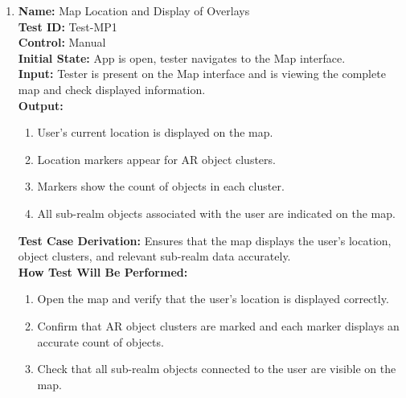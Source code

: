 \documentclass[12pt, titlepage]{article}
\begin{document}
\begin{enumerate}

  \item \textbf{Name:} Map Location and Display of Overlays \label{itm:Test-MP1} \\
  \textbf{Test ID:} Test-MP1 \\
  \textbf{Control:} Manual \\
  \textbf{Initial State:} App is open, tester navigates to the Map interface. \\
  \textbf{Input:} Tester is present on the Map interface and is viewing the complete map and check displayed information. \\
  \textbf{Output:}
  \begin{enumerate}
    \item User's current location is displayed on the map.
    \item Location markers appear for AR object clusters.
    \item Markers show the count of objects in each cluster.
    \item All sub-realm objects associated with the user are indicated on the map.
  \end{enumerate}
  \textbf{Test Case Derivation:} Ensures that the map displays the user's location, object clusters, and relevant sub-realm data accurately. \\
  \textbf{How Test Will Be Performed:}
  \begin{enumerate}
    \item Open the map and verify that the user's location is displayed correctly.
    \item Confirm that AR object clusters are marked and each marker displays an accurate count of objects.
    \item Check that all sub-realm objects connected to the user are visible on the map.
  \end{enumerate}


\end{enumerate}
\end{document}
